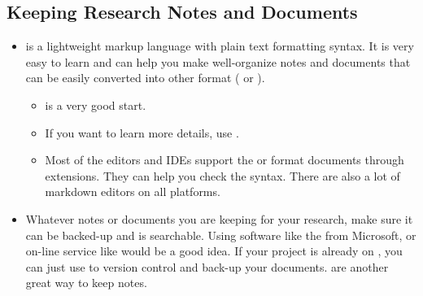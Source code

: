 \documentclass[letterpaper,10pt,english]{sphinxmanual}
\begin{document}
\subsection{Keeping Research Notes and Documents}
\label{\detokenize{resource/research/getting_started:keeping-research-notes-and-documents}}\begin{itemize}
\item {} 
 is a
lightweight markup language with plain text formatting syntax. It is
very easy to learn and can help you make well-organize notes and
documents that can be easily converted into other format ( or
).
\begin{itemize}
\item {} 
is a very good start.

\item {} 
If you want to learn more details, use .

\item {} 
Most of the editors and IDEs support the  or 
format documents through extensions. They can help you check the
syntax. There are also a lot of markdown editors on all platforms.

\end{itemize}

\item {} 
Whatever notes or documents you are keeping for your research, make
sure it can be backed-up and is searchable. Using software like the
 from
Microsoft, or on-line service like
 would be a good idea. If your
project is already on , you can just use  to version
control and back-up your documents.  are another
great way to keep notes.

\end{itemize}
\end{document}
